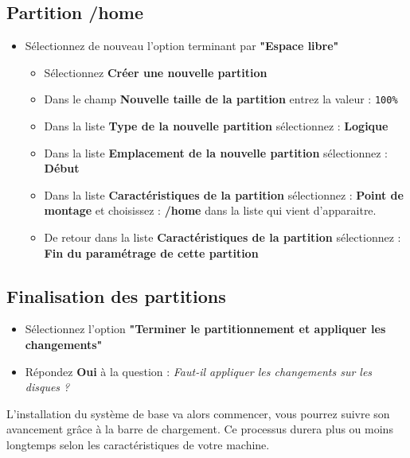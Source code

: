 \subsection{Partition /home}
\begin{itemize}
	\item Sélectionnez de nouveau l'option terminant par \textbf{"Espace libre"}
	\begin{itemize}
		\item Sélectionnez \textbf{Créer une nouvelle partition}
		\item Dans le champ \textbf{Nouvelle taille de la partition} entrez la valeur : \texttt{100\%}
		\item Dans la liste \textbf{Type de la nouvelle partition} sélectionnez : \textbf{Logique}
		\item Dans la liste \textbf{Emplacement de la nouvelle partition} sélectionnez : \textbf{Début}
		\item Dans la liste \textbf{Caractéristiques de la partition} sélectionnez : \textbf{Point de montage} et choisissez : \textbf{/home} dans la liste qui vient d'apparaitre.
		\item De retour dans la liste \textbf{Caractéristiques de la partition} sélectionnez : \textbf{Fin du paramétrage de cette partition}
	\end{itemize}	
\end{itemize}



\subsection{Finalisation des partitions}
\begin{itemize}
	\item Sélectionnez l'option \textbf{"Terminer le partitionnement et appliquer les changements"}
	\item Répondez \textbf{Oui} à la question : \textit{Faut-il appliquer les changements sur les disques ?}\\
\end{itemize}

L'installation du système de base va alors commencer, vous pourrez suivre son avancement grâce à la barre de chargement. Ce processus durera plus ou moins longtemps selon les caractéristiques de votre machine.

